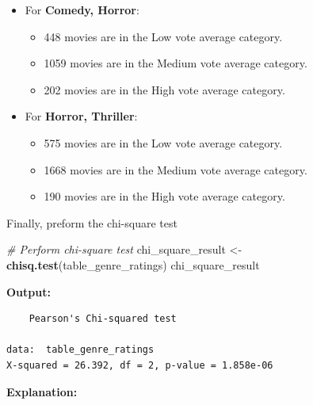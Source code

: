 \documentclass[
]{book}
\newenvironment{Shaded}{\begin{snugshade}}{\end{snugshade}}
\newcommand{\CommentTok}[1]{\textcolor[rgb]{0.56,0.35,0.01}{\textit{#1}}}
\newcommand{\FunctionTok}[1]{\textcolor[rgb]{0.13,0.29,0.53}{\textbf{#1}}}
\newcommand{\NormalTok}[1]{#1}
\newcommand{\OtherTok}[1]{\textcolor[rgb]{0.56,0.35,0.01}{#1}}
\providecommand{\tightlist}{%
  \setlength{\itemsep}{0pt}\setlength{\parskip}{0pt}}
\begin{document}
\begin{itemize}
\tightlist
\item
  For \textbf{Comedy, Horror}:

  \begin{itemize}
  \tightlist
  \item
    448 movies are in the Low vote average category.
  \item
    1059 movies are in the Medium vote average category.
  \item
    202 movies are in the High vote average category.
  \end{itemize}
\item
  For \textbf{Horror, Thriller}:

  \begin{itemize}
  \tightlist
  \item
    575 movies are in the Low vote average category.
  \item
    1668 movies are in the Medium vote average category.
  \item
    190 movies are in the High vote average category.
  \end{itemize}
\end{itemize}

Finally, preform the chi-square test

\begin{Shaded}
\begin{Highlighting}[]
\CommentTok{\# Perform chi{-}square test}
\NormalTok{chi\_square\_result }\OtherTok{\textless{}{-}} \FunctionTok{chisq.test}\NormalTok{(table\_genre\_ratings)}
\NormalTok{chi\_square\_result}
\end{Highlighting}
\end{Shaded}

\textbf{Output:}

\begin{verbatim}
    Pearson's Chi-squared test

data:  table_genre_ratings
X-squared = 26.392, df = 2, p-value = 1.858e-06
\end{verbatim}

\textbf{Explanation:}
\end{document}
